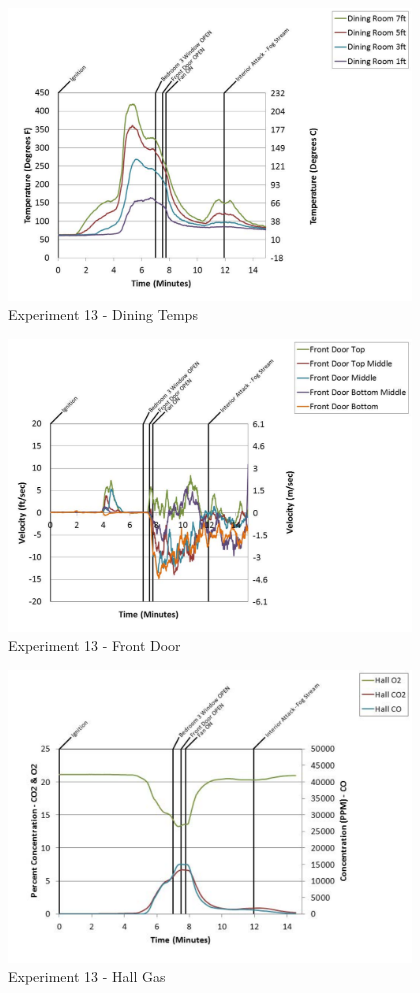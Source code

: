 \documentclass{article}
\begin{document}
\begin{appendices}
	\clearpage

	\begin{figure}[h!]
		\centering
		\includegraphics[height=3.05in]{0_Images/Results_Charts/Exp_13_Charts/DiningTemps.pdf}
		\caption{Experiment 13 - Dining Temps}
	\end{figure}
 

	\begin{figure}[h!]
		\centering
		\includegraphics[height=3.05in]{0_Images/Results_Charts/Exp_13_Charts/FrontDoor.pdf}
		\caption{Experiment 13 - Front Door}
	\end{figure}
 
	\clearpage

	\begin{figure}[h!]
		\centering
		\includegraphics[height=3.05in]{0_Images/Results_Charts/Exp_13_Charts/HallGas.pdf}
		\caption{Experiment 13 - Hall Gas}
	\end{figure}
 


\end{appendices}
\end{document}
